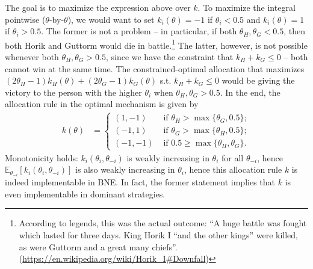 \documentclass[a4paper]{article}
\begin{document}
\begin{enumerate}
	The goal is to maximize the expression above over $k$. To maximize the integral pointwise ($\theta$-by-$\theta$), we would want to set $k_i(\theta) = -1$ if $\theta_i < 0.5$ and $k_i(\theta) = 1$ if $\theta_i > 0.5$. The former is not a problem -- in particular, if both $\theta_H,\theta_G < 0.5$, then both Horik and Guttorm would die in battle.\footnote{According to legends, this was the actual outcome: ``A huge battle was fought which lasted for three days. King Horik I ``and the other kings'' were killed, as were Guttorm and a great many chiefs''. (\url{https://en.wikipedia.org/wiki/Horik_I\#Downfall})}
	The latter, however, is not possible whenever both $\theta_H,\theta_G>0.5$, since we have the constraint that $k_H+k_G \leq 0$ -- both cannot win at the same time. The constrained-optimal allocation that maximizes $(2\theta_H - 1) k_H(\theta) + (2\theta_G - 1) k_G(\theta)$ s.t. $k_H+k_G \leq 0$ would be giving the victory to the person with the higher $\theta_i$ when $\theta_H,\theta_G>0.5$. In the end, the allocation rule in the optimal mechanism is given by
	\begin{align*}
		k(\theta) & =\begin{cases}
			(1,-1) & \text{ if }\theta_{H}>\max\{\theta_{G},0.5\};\\
			(-1,1) & \text{ if }\theta_{G}>\max\{\theta_{H},0.5\};\\
			(-1,-1) & \text{ if }0.5\geq \max\{\theta_H,\theta_G\}.
		\end{cases}
	\end{align*}
	Monotonicity holds: $k_i(\theta_i,\theta_{-i})$ is weakly increasing in $\theta_i$ for all $\theta_{-i}$, hence $\mathbb{E}_{\theta_{-i}} [k_i(\theta_i,\theta_{-i})]$ is also weakly increasing in $\theta_i$, hence this allocation rule $k$ is indeed implementable in BNE. In fact, the former statement implies that $k$ is even implementable in dominant strategies.
	

\end{enumerate}
\end{document}
